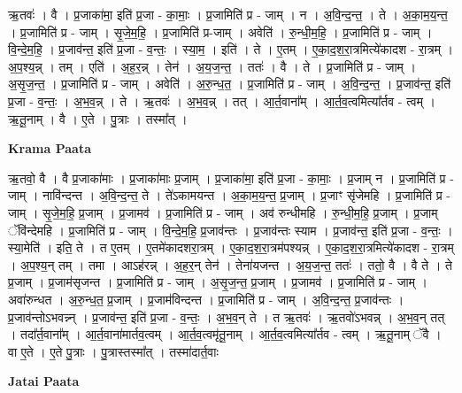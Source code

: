 \documentclass[17pt]{extarticle}
\begin{document}
ऋ॒तवः॑ । वै । प्र॒जाका॑मा॒ इति॑ प्र॒जा - का॒माः॒ । प्र॒जामिति॑ प्र - जाम् । न । अ॒वि॒न्द॒न्त॒ । ते । अ॒का॒म॒य॒न्त॒ । प्र॒जामिति॑ प्र - जाम् । सृ॒जे॒म॒हि॒ । प्र॒जामिति॑ प्र-जाम् । अवेति॑ । रु॒न्धी॒म॒हि॒ । प्र॒जामिति॑ प्र - जाम् । वि॒न्दे॒म॒हि॒ । प्र॒जाव॑न्त॒ इति॑ प्र॒जा - व॒न्तः॒ । स्या॒म॒ । इति॑ । ते । ए॒तम् । ए॒का॒द॒श॒रा॒त्रमित्ये॑कादश - रा॒त्रम् । अ॒प॒श्य॒न्न् । तम् । एति॑ । अ॒ह॒र॒न्न् । तेन॑ । अ॒य॒ज॒न्त॒ । ततः॑ । वै । ते । प्र॒जामिति॑ प्र - जाम् । अ॒सृ॒ज॒न्त॒ । प्र॒जामिति॑ प्र - जाम् । अवेति॑ । अ॒रु॒न्ध॒त॒ । प्र॒जामिति॑ प्र - जाम् । अ॒वि॒न्द॒न्त॒ । प्र॒जाव॑न्त॒ इति॑ प्र॒जा - व॒न्तः॒ । अ॒भ॒व॒न्न् । ते । ऋ॒तवः॑ । अ॒भ॒व॒न्न् । तत् । आ॒र्त॒वाना᳚म् । आ॒र्त॒व॒त्वमित्या᳚र्तव - त्वम् । ऋ॒तू॒नाम् । वै । ए॒ते । पु॒त्राः । तस्मा᳚त् ।  \newline


\textbf{Krama Paata} \newline

ऋ॒तवो॒ वै । वै प्र॒जाका॑माः । प्र॒जाका॑माः प्र॒जाम् । प्र॒जाका॑मा॒ इति॑ प्र॒जा - का॒माः॒ । प्र॒जाम् न । प्र॒जामिति॑ प्र - जाम् । नावि॑न्दन्त । अ॒वि॒न्द॒न्त॒ ते । ते॑ऽकामयन्त । अ॒का॒म॒य॒न्त॒ प्र॒जाम् । प्र॒जाꣳ सृ॑जेमहि । प्र॒जामिति॑ प्र - जाम् । सृ॒जे॒म॒हि॒ प्र॒जाम् । प्र॒जामव॑ । प्र॒जामिति॑ प्र - जाम् । अव॑ रुन्धीमहि । रु॒न्धी॒म॒हि॒ प्र॒जाम् । प्र॒जाम् ॅवि॑न्देमहि । प्र॒जामिति॑ प्र - जाम् । वि॒न्दे॒म॒हि॒ प्र॒जाव॑न्तः । प्र॒जाव॑न्तः स्याम । प्र॒जाव॑न्त॒ इति॑ प्र॒जा - व॒न्तः॒ । स्या॒मेति॑ । इति॒ ते । त ए॒तम् । ए॒तमे॑कादशरा॒त्रम् । ए॒का॒द॒श॒रा॒त्रम॑पश्यन्न् । ए॒का॒द॒श॒रा॒त्रमित्ये॑कादश - रा॒त्रम् । अ॒प॒श्य॒न् तम् । तमा । आऽह॑रन्न् । अ॒ह॒र॒न् तेन॑ । तेना॑यजन्त । अ॒य॒ज॒न्त॒ ततः॑ । ततो॒ वै । वै ते । ते प्र॒जाम् । प्र॒जाम॑सृजन्त । प्र॒जामिति॑ प्र - जाम् । अ॒सृ॒ज॒न्त॒ प्र॒जाम् । प्र॒जामव॑ । प्र॒जामिति॑ प्र - जाम् । अवा॑रुन्धत । अ॒रु॒न्ध॒त॒ प्र॒जाम् । प्र॒जाम॑विन्दन्त । प्र॒जामिति॑ प्र - जाम् । अ॒वि॒न्द॒न्त॒ प्र॒जाव॑न्तः । प्र॒जाव॑न्तोऽभवन्न्न् । प्र॒जाव॑न्त॒ इति॑ प्र॒जा - व॒न्तः॒ । अ॒भ॒व॒न् ते । त ऋ॒तवः॑ । ऋ॒तवो॑ऽभवन्न् । अ॒भ॒व॒न् तत् । तदा᳚र्त॒वाना᳚म् । आ॒र्त॒वाना॑मार्तव॒त्वम् । आ॒र्त॒व॒त्वमृ॑तू॒नाम् । आ॒र्त॒व॒त्वमित्या᳚र्तव - त्वम् । ऋ॒तू॒नाम् ॅवै । वा ए॒ते । ए॒ते पु॒त्राः । पु॒त्रास्तस्मा᳚त् । तस्मा॑दार्त॒वाः \newline

\textbf{Jatai Paata} \newline
\end{document}
